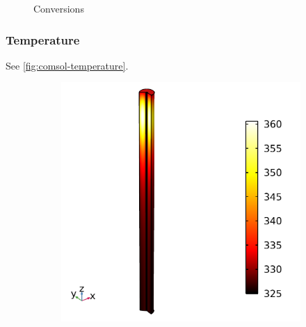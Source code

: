 \begin{figure}[h]
    \caption{Conversions}
    \label{fig:comsol-conversion}
\end{figure}

\subsubsection{Temperature}

See \cref{fig:comsol-temperature}.

\begin{figure}[h]
    \centering

    \begin{subfigure}{0.49\linewidth}
        \includegraphics[width=\linewidth]{figures/temperature-surface.png}
        \caption{}
        \label{fig:comsol-temperature:surface}
    \end{subfigure}
    \begin{subfigure}{0.49\linewidth}

\end{subfigure}
\end{figure}
